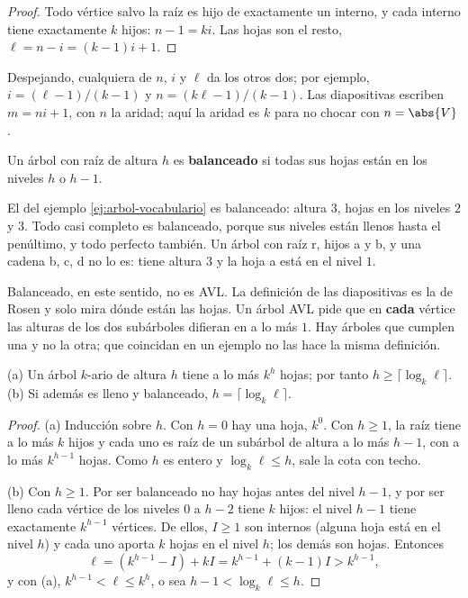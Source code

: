 \documentclass[11pt,letterpaper]{article}
\begin{document}
\begin{proof}
  Todo vértice salvo la raíz es hijo de exactamente un interno, y cada
  interno tiene exactamente $k$ hijos: $n - 1 = ki$. Las hojas son el
  resto, $\ell = n - i = (k - 1)i + 1$.
\end{proof}

Despejando, cualquiera de $n$, $i$ y $\ell$ da los otros dos; por
ejemplo, $i = (\ell - 1)/(k - 1)$ y $n = (k\ell - 1)/(k - 1)$. Las
diapositivas escriben $m = ni + 1$, con $n$ la aridad; aquí la aridad
es $k$ para no chocar con $n = \abs{V}$.

\begin{definicion}
  Un árbol con raíz de altura $h$ es \textbf{balanceado} si todas sus
  hojas están en los niveles $h$ o $h - 1$.
\end{definicion}

El del ejemplo \ref{ej:arbol-vocabulario} es balanceado: altura $3$,
hojas en los niveles $2$ y $3$. Todo casi completo es balanceado,
porque sus niveles están llenos hasta el penúltimo, y todo perfecto
también. Un árbol con raíz r, hijos a y b, y una cadena b, c, d no lo
es: tiene altura $3$ y la hoja a está en el nivel $1$.

\begin{ojo}
  Balanceado, en este sentido, no es AVL. La definición de las
  diapositivas es la de Rosen y solo mira dónde están las hojas. Un
  árbol AVL pide que en \textbf{cada} vértice las alturas de los dos
  subárboles difieran en a lo más $1$. Hay árboles que cumplen una y
  no la otra; que coincidan en un ejemplo no las hace la misma
  definición.
\end{ojo}

\begin{teorema}
  \label{teo:arbol-altura}
  (a) Un árbol $k$-ario de altura $h$ tiene a lo más $k^h$ hojas;
  por tanto $h \ge \lceil \log_k \ell \rceil$. (b) Si además es lleno
  y balanceado, $h = \lceil \log_k \ell \rceil$.
\end{teorema}

\begin{proof}
  (a) Inducción sobre $h$. Con $h = 0$ hay una hoja, $k^0$. Con
  $h \ge 1$, la raíz tiene a lo más $k$ hijos y cada uno es raíz de un
  subárbol de altura a lo más $h - 1$, con a lo más $k^{h-1}$ hojas.
  Como $h$ es entero y $\log_k \ell \le h$, sale la cota con techo.

  (b) Con $h \ge 1$. Por ser balanceado no hay hojas antes del nivel
  $h - 1$, y por ser lleno cada vértice de los niveles $0$ a $h - 2$
  tiene $k$ hijos: el nivel $h - 1$ tiene exactamente $k^{h-1}$
  vértices. De ellos, $I \ge 1$ son internos (alguna hoja está en el
  nivel $h$) y cada uno aporta $k$ hojas en el nivel $h$; los demás
  son hojas. Entonces
  \[
    \ell = (k^{h-1} - I) + kI = k^{h-1} + (k - 1)I > k^{h-1} ,
  \]
  y con (a), $k^{h-1} < \ell \le k^h$, o sea
  $h - 1 < \log_k \ell \le h$.
\end{proof}
\end{document}
